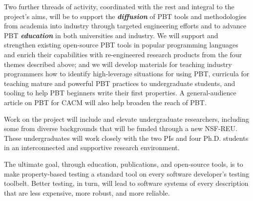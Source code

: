 Two further threads of activity, coordinated with the rest and integral to the
project's aims, will
%
be to support the {\bf\em diffusion} of PBT tools and
methodologies from academia into industry through targeted engineering efforts
%
and to advance PBT {\bf\em education} in
both universities and industry.  We will support and strengthen existing
open-source PBT tools in popular programming languages and enrich their
capabilities with re-engineered research products from the four themes described
above;
%
and we will
develop materials for teaching industry programmers how to identify
high-leverage situations for using PBT, curricula for teaching mature
and powerful PBT practices to undergraduate students, and tooling to help
PBT beginners write their first properties.
%
A general-audience article on PBT for CACM will also help broaden the
reach of PBT.\iflater{}\fi

Work on the project will include and elevate undergraduate
researchers, including some from diverse backgrounds that will be
funded through a new NSF-REU. These undergraduates will work
closely with the two PIs and four Ph.D.{} students in an interconnected and supportive
research environment.

The ultimate goal, through education, publications, and open-source
tools, is to make property-based testing a standard tool on every
software developer's testing toolbelt.  Better testing, in turn, will
lead to software systems of every description that are less expensive, more
robust, and more reliable.


